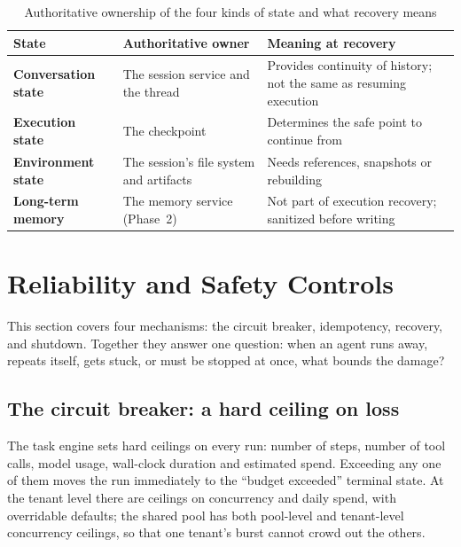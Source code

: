 \begin{table}[htbp]
\centering
\caption{Authoritative ownership of the four kinds of state and what recovery means}
\label{tab:state-owner}
\begin{tabularx}{\textwidth}{@{}>{\bfseries}L{3.0cm}L{4.8cm}Y@{}}
  \toprule
  \textbf{State} & \textbf{Authoritative owner} & \textbf{Meaning at recovery}\\
  \midrule
  Conversation state & The session service and the thread & Provides continuity of history; not the same as resuming execution\\
  Execution state & The checkpoint & Determines the safe point to continue from\\
  Environment state & The session's file system and artifacts & Needs references, snapshots or rebuilding\\
  Long-term memory & The memory service (Phase~2) & Not part of execution recovery; sanitized before writing\\
  \bottomrule
\end{tabularx}
\end{table}

\section{Reliability and Safety Controls}
\label{sec:reliability}

This section covers four mechanisms: the circuit breaker, idempotency, recovery, and shutdown. Together they answer one question: when an agent runs away, repeats itself, gets stuck, or must be stopped at once, what bounds the damage?

\subsection{The circuit breaker: a hard ceiling on loss}

The task engine sets hard ceilings on every run: number of steps, number of tool calls, model usage, wall-clock duration and estimated spend. Exceeding any one of them moves the run immediately to the ``budget exceeded'' terminal state. At the tenant level there are ceilings on concurrency and daily spend, with overridable defaults; the shared pool has both pool-level and tenant-level concurrency ceilings, so that one tenant's burst cannot crowd out the others.

